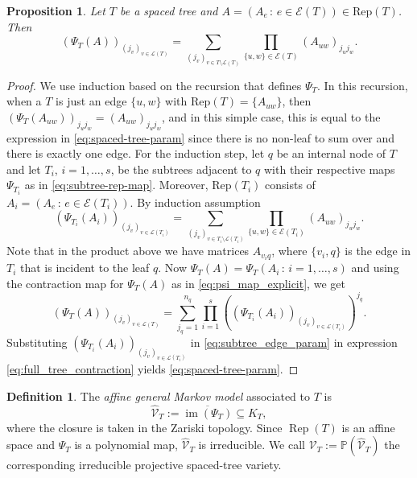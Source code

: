 \documentclass[12pt]{article}
\newtheorem{proposition}[theorem]{Proposition}
\theoremstyle{definition}
\newtheorem{definition}[theorem]{Definition}
\numberwithin{theorem}{section}
\newcommand{\V}{\mathcal{V}}
\begin{document}
\begin{proposition} \label{prop:spaced-tree-parametrization} Let $T$ be a spaced tree and $A = (A_e \, : \, e \in \mathcal{E}(T)) \in \mathrm{Rep}(T)$. Then
\begin{equation} \label{eq:spaced-tree-param} 
(\Psi_T(A))_{(j_v)_{v \in \mathcal{L}(T)}} = \sum_{(j_v)_{v\in T \setminus \mathcal{L}(T)}} \prod_{\{u,w\} \in \mathcal{E}(T)} (A_{uw})_{j_u j_w}.
\end{equation}
\end{proposition}
\begin{proof}
We use induction based on the recursion that defines $\Psi_T$. In this recursion, when a $T$ is just an edge $\{u,w\}$ with $\mathrm{Rep}(T) = \{A_{uw}\}$, then $(\Psi_T(A_{uw}))_{j_uj_w} = (A_{uw})_{j_uj_w}$, and in this simple case, this is equal to the expression in \eqref{eq:spaced-tree-param} since there is no non-leaf to sum over and there is exactly one edge. For the induction step, let $q$ be an internal node of $T$ and let $T_i$, $i=1,\ldots, s$, be the subtrees adjacent to $q$ with their respective maps $\Psi_{T_i}$ as in  \eqref{eq:subtree-rep-map}. Moreover, $\mathrm{Rep}(T_i)$ consists of $A_i = (A_e \, : \, e \in \mathcal{E}(T_i))$.
By induction assumption
\begin{equation}\label{eq:subtree_edge_param}
    (\Psi_{T_i}(A_i))_{(j_v)_{v \in \mathcal{L}(T_i)}} = \sum_{(j_v)_{v \in T_i \setminus\mathcal{L}(T_i)}} \prod_{\{u,w\} \in \mathcal{E}(T_i)} (A_{uw})_{j_u j_w}.
\end{equation}
Note that in the product above we have matrices $A_{v_iq}$, where $\{v_i, q\}$ is the edge in $T_i$ that is incident to 
the leaf $q$.  Now $\Psi_T(A) = \Psi_T(A_i \, : \, i=1, \ldots, s)$ 
and using the contraction map 
for $\Psi_T(A)$ as in \eqref{eq:psi_map_explicit}, we get
\begin{equation}\label{eq:full_tree_contraction}
    (\Psi_T(A))_{(j_v)_{v \in \mathcal{L}(T)}} = \sum_{j_q=1}^{n_q} \prod_{i=1}^s ((\Psi_{T_i}(A_i))_{(j_v)_{v \in \mathcal{L}(T_i)}})^{j_{q}}.
\end{equation}
Substituting $(\Psi_{T_i}(A_i))_{(j_v)_{v \in \mathcal{L}(T_i)}}$ in \eqref{eq:subtree_edge_param} in expression \eqref{eq:full_tree_contraction} yields \eqref{eq:spaced-tree-param}.
\end{proof}

\begin{definition}\cite[Definition 1.5]{DK09}
The \emph{affine general Markov model} associated to $T$ is
\[
\widehat{\V}_T
:=
\overline{\operatorname{im}(\Psi_T)}
\subseteq
K_T,
\]
where the closure is taken in the Zariski topology. Since
$\operatorname{Rep}(T)$ is an affine space and $\Psi_T$ is a
polynomial map, $\widehat{\V}_T$ is irreducible. We call $\V_T:=\mathbb P(\widehat{\V}_T)$ the corresponding irreducible projective spaced-tree variety.
\end{definition}
\end{document}

